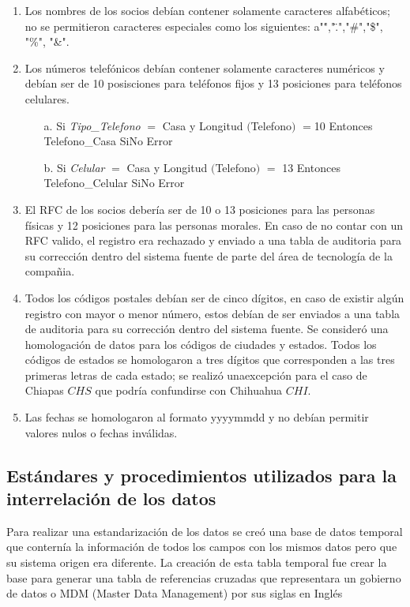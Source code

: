 \documentclass[a4paper,openright,12pt]{book}
\begin{document}
\begin{enumerate}
\item Los nombres de los socios deb\'ian contener solamente caracteres alfab\'eticos; no se permitieron caracteres especiales como los siguientes: a"\.","\".","\#","\$", "\%", "\&".
\item Los n\'umeros telef\'onicos deb\'ian contener solamente caracteres num\'ericos y deb\'ian ser de 10 posisciones para tel\'efonos fijos y 13 posiciones para tel\'efonos celulares.
\begin{itemize}
\item[a.] Si \textit{Tipo\_Telefono}  $=$ Casa y Longitud $($Telefono$)$  $=$10 Entonces Telefono\_Casa SiNo Error
\item[b.] Si \textit{Celular} $=$ Casa y Longitud $($Telefono$)$ $=$ 13 Entonces Telefono\_Celular SiNo Error
\end{itemize}  
\item El RFC de los socios deber\'ia ser de 10 o 13 posiciones para las personas f\'isicas y 12 posiciones para las personas morales. En caso de no contar con un RFC valido, el registro era rechazado y enviado a una tabla de auditoria para su correcci\'on dentro del sistema fuente de parte del \'area de tecnolog\'ia de la compa\~nia. 
\item Todos los c\'odigos postales deb\'ian ser de cinco d\'igitos, en caso de existir alg\'un registro con mayor o menor n\'umero, estos deb\'ian de ser enviados a una tabla de auditoria para su correcci\'on dentro del sistema fuente. Se consider\'o una homologaci\'on de datos para los c\'odigos de ciudades y estados. Todos los c\'odigos de estados se homologaron a tres d\'igitos que corresponden a las tres primeras letras de cada estado; se realiz\'o unaexcepci\'on para el caso de Chiapas \(CHS\) que podr\'ia confundirse con Chihuahua \(CHI\).
\item Las fechas se homologaron al formato yyyymmdd y no deb\'ian permitir valores nulos o fechas inv\'alidas.
\end{enumerate}
\subsection{Est\'andares y procedimientos utilizados para la interrelaci\'on de los datos}
Para realizar una estandarizaci\'on de los datos se cre\'o una base de datos temporal que contern\'ia la informaci\'on de todos los campos con los mismos datos pero que su sistema origen era diferente. La creaci\'on de esta tabla temporal fue crear la base para generar una tabla de referencias cruzadas que representara un gobierno de datos o MDM (Master Data Management) por sus siglas en Inglés
\end{document}

